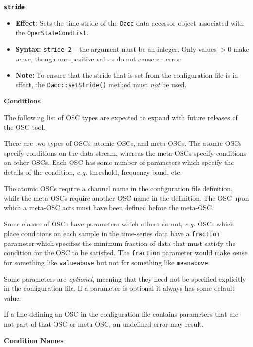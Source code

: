 \documentclass[11pt]{article}
\begin{document}
{\large\texttt{\textbf{stride}}}
\begin{itemize}
\item \textbf{Effect:} Sets the time stride of the \texttt{Dacc} data
  accessor object associated with the \texttt{OperStateCondList}.
\item \textbf{Syntax:} \texttt{stride 2} -- the argument must be an
  integer. Only values $> 0$ make sense, though non-positive values do
  not cause an error.
\item \textbf{Note:} To ensure that the stride that is set from the
  configuration file is in effect, the \texttt{Dacc::setStride()}
  method must \textit{not} be used.
\end{itemize}

\begin{center}
\textbf{{\large Conditions}}
\end{center}

The following list of OSC types are expected to expand with future
releases of the OSC tool.

There are two types of OSCs: atomic OSCs, and meta-OSCs.  The atomic
OSCs specify conditions on the data stream, whereas the meta-OSCs
specify conditions on other OSCs.  Each OSC has some number of
parameters which specify the details of the condition, \textit{e.g.}
threshold, frequency band, etc.

The atomic OSCs require a channel name in the configuration file
definition, while the meta-OSCs require another OSC name in the
definition.  The OSC upon which a meta-OSC acts must have been defined
before the meta-OSC.

Some classes of OSCs have parameters which others do not, \textit{e.g.}
OSCs which place conditions on each sample in the time-series data
have a \texttt{fraction} parameter which specifies the minimum fraction
of data that must satisfy the condition for the OSC to be satisfied.
The \texttt{fraction} parameter would make sense for something like 
\texttt{valueabove} but not for something like \texttt{meanabove}.

Some parameters are \textit{optional}, meaning that they need not be
specified explicitly in the configuration file.  If a parameter is
optional it always has some default value.

If a line defining an OSC in the configuration file contains
parameters that are not part of that OSC or meta-OSC, an undefined
error may result.

\begin{center}
  \textbf{{\large Condition Names}}
\end{center}
\end{document}
